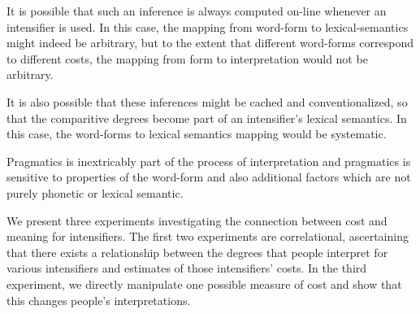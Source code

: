 \documentclass[10pt,letterpaper]{article}
\begin{document}
It is possible that such an inference is always computed on-line whenever an intensifier is used. In this case, the mapping from word-form to lexical-semantics might indeed be arbitrary, but to the extent that different word-forms correspond to different costs, the mapping from form to interpretation would not be arbitrary.

It is also possible that these inferences might be cached and conventionalized, so that the comparitive degrees become part of an intensifier's lexical semantics. In this case, the word-forms to lexical semantics mapping would be systematic.

Pragmatics is inextricably part of the process of interpretation and pragmatics is sensitive to properties of the word-form and also additional factors which are not purely phonetic or lexical semantic.


We present three experiments investigating the connection between cost and meaning for intensifiers. The first two experiments are correlational, ascertaining that there exists a relationship between the degrees that people interpret for various intensifiers and estimates of those intensifiers' costs. In the third experiment, we directly manipulate one possible measure of cost and show that this changes people's interpretations.
\end{document}
